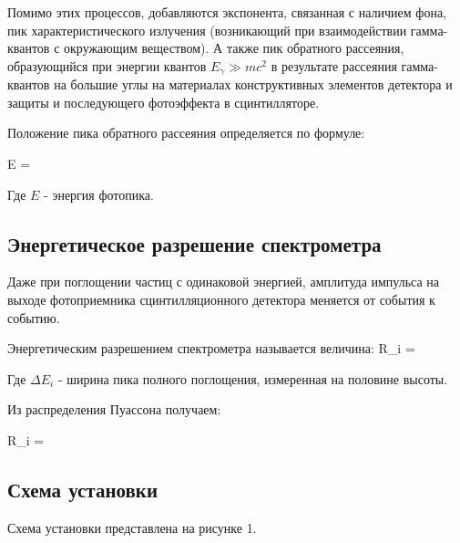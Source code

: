 Помимо этих процессов, добавляются экспонента, связанная с наличием фона, пик
характеристического излучения (возникающий при взаимодействии гамма-квантов с окружающим
веществом). А также пик обратного рассеяния, образующийся при энергии квантов
$ E_\gamma \gg mc^2 $ в результате рассеяния гамма-квантов на большие углы на материалах
конструктивных элементов детектора и защиты и последующего фотоэффекта в сцинтилляторе.

Положение пика обратного рассеяния определяется по формуле:

{E = }

Где $ E $ - энергия фотопика.

\subsection{Энергетическое разрешение спектрометра}

Даже при поглощении частиц с одинаковой энергией, амплитуда импульса на выходе фотоприемника
сцинтилляционного детектора меняется от события к событию.

Энергетическим разрешением спектрометра называется величина:
{R_i = }

Где $ \Delta E_i $ - ширина пика полного поглощения, измеренная на половине высоты.

Из распределения Пуассона получаем:

{R_i = }

\subsection{Схема установки}
Схема установки представлена на рисунке 1.

